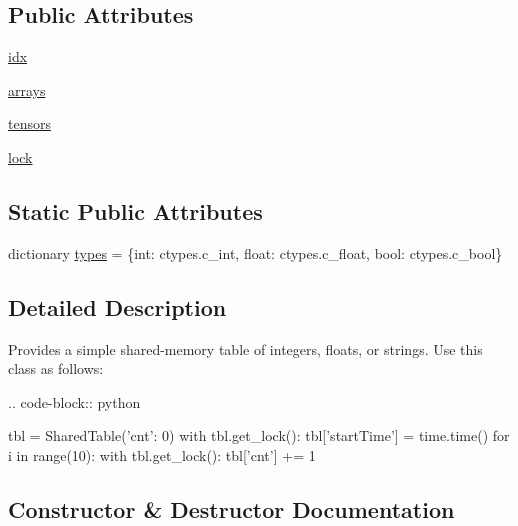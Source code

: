 \subsection*{Public Attributes}
\begin{DoxyCompactItemize}
\item 
\hyperlink{classparlai_1_1agents_1_1legacy__agents_1_1seq2seq_1_1utils__v0_1_1SharedTable_ae28772f48b62430475ee87a0e0165297}{idx}
\item 
\hyperlink{classparlai_1_1agents_1_1legacy__agents_1_1seq2seq_1_1utils__v0_1_1SharedTable_a85e95ce5ffe060084b0aac12e09eb04d}{arrays}
\item 
\hyperlink{classparlai_1_1agents_1_1legacy__agents_1_1seq2seq_1_1utils__v0_1_1SharedTable_a10fd3cbec22c17f5e522d7813f3d3056}{tensors}
\item 
\hyperlink{classparlai_1_1agents_1_1legacy__agents_1_1seq2seq_1_1utils__v0_1_1SharedTable_acd92e05b572beb74c384c3c6b833dac6}{lock}
\end{DoxyCompactItemize}
\subsection*{Static Public Attributes}
\begin{DoxyCompactItemize}
\item 
dictionary \hyperlink{classparlai_1_1agents_1_1legacy__agents_1_1seq2seq_1_1utils__v0_1_1SharedTable_ac7e68f60287f180ffacb892540d737b8}{types} = \{int\+: ctypes.\+c\+\_\+int, float\+: ctypes.\+c\+\_\+float, bool\+: ctypes.\+c\+\_\+bool\}
\end{DoxyCompactItemize}


\subsection{Detailed Description}
\begin{DoxyVerb}Provides a simple shared-memory table of integers, floats, or strings. Use this
class as follows:

.. code-block:: python

    tbl = SharedTable({'cnt': 0})
    with tbl.get_lock():
        tbl['startTime'] = time.time()
    for i in range(10):
        with tbl.get_lock():
            tbl['cnt'] += 1
\end{DoxyVerb}
 

\subsection{Constructor \& Destructor Documentation}
\mbox{\label{classparlai_1_1agents_1_1legacy__agents_1_1seq2seq_1_1utils__v0_1_1SharedTable_a0bb7ef513d5028c6f011cc09c6934dea}} 
